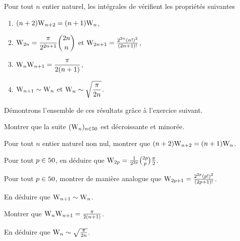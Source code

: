 \begin{theo}{}  Pour tout $n$ entier naturel, les intégrales de  vérifient les propriétés suivantes
\begin{enumerate}[label=(\roman*)]
    \item $(n + 2) \mathrm{W}_{n+2} = (n + 1) \mathrm{W}_n$,  
    \item $\displaystyle \mathrm{W}_{2n} = \frac{\pi}{2^{2n+1}} \binom{2n}{n}$ et $\mathrm{W}_{2n+1} = \frac{2^{2n} (n!)^2}{(2n+1)!}$,
    \item $\displaystyle \mathrm{W}_n \mathrm{W}_{n+1} = \frac{\pi}{2(n+1)}$,
    \item $\mathrm{W}_{n+1} \sim \mathrm{W}_n$ et $\displaystyle \mathrm{W}_n \sim \sqrt{\frac{\pi}{2n}}$.
\end{enumerate}
\end{theo}
Démontrons l'ensemble de ces résultats grâce à l'exercice suivant.
\begin{exercice}\label{exo:propWallis}
\begin{questions}
\item Montrer que la suite $(\mathrm{W}_n)_{n\in50}$ est décroissante et minorée.

\item Pour tout $n$ entier naturel non nul, montrer que $(n + 2) \mathrm{W}_{n+2} = (n + 1) \mathrm{W}_n$.

\item Pour tout $p \in 50$, en déduire que $\mathrm{W}_{2p} = \frac{1}{2^{2p}} \binom{2p}{p} \frac{\pi}{2}$.

\item Pour tout $p \in 50$, montrer de manière analogue que $\mathrm{W}_{2p+1} = \frac{2^{2p} (p!)^2}{(2p+1)!}$.

\item En déduire que $\mathrm{W}_{n+1} \sim \mathrm{W}_n$.

\item Montrer que $\mathrm{W}_n \mathrm{W}_{n+1} = \frac{\pi}{2 (n + 1)}$.

\item En déduire que $\mathrm{W}_n \sim \sqrt{\frac{\pi}{2n}}$.
\end{questions}
\end{exercice}

